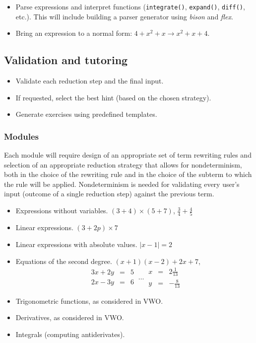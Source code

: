 \documentclass[10pt,a4paper]{article}
\begin{document}
\begin{itemize}
    \item Parse expressions and interpret functions (\texttt{integrate()},
    \texttt{expand()}, \texttt{diff()}, etc.). This will include building a
    parser generator using \emph{bison} and \emph{flex}.
    \item Bring an expression to a normal form:
    $4 + x^2 + x \rightarrow x^2 + x + 4$.
\end{itemize}

\subsection{Validation and tutoring}

\begin{itemize}
    \item Validate each reduction step and the final input.
    \item If requested, select the best hint (based on the chosen strategy).
    \item Generate exercises using predefined templates.
\end{itemize}

\subsubsection{Modules}

Each module will require design of an appropriate set of term
rewriting rules and selection of an appropriate reduction strategy
that allows for nondeterminism, both in the choice of the rewriting
rule and in the choice of the subterm to which the rule will be
applied. Nondeterminism is needed for validating every user's input
(outcome of a single reduction step) against the previous term.

\begin{itemize}
    \item Expressions without variables. $(3+4) \times (5+7)$,
    $\frac{3}{4} + \frac{4}{5}$
    \item Linear expressions. $(3+2p) \times 7$
    \item Linear expressions with absolute values. $|x-1| = 2$
    \item Equations of the second degree. $(x+1)(x-2) + 2x + 7$,
    $$ \
    \begin{array}{|rcr|}
    3x + 2y & = & 5 \\
    2x - 3y & = & 6
    \end{array}
    \
    \dots
    \
    \begin{array}{|rcr|}
    x & = & 2\frac{1}{13} \\
    y & = & -\frac{8}{13}
    \end{array}
    $$

    \item Trigonometric functions, as considered in VWO.
    \item Derivatives, as considered in VWO.
    \item Integrals (computing antiderivates).
\end{itemize}
\end{document}
